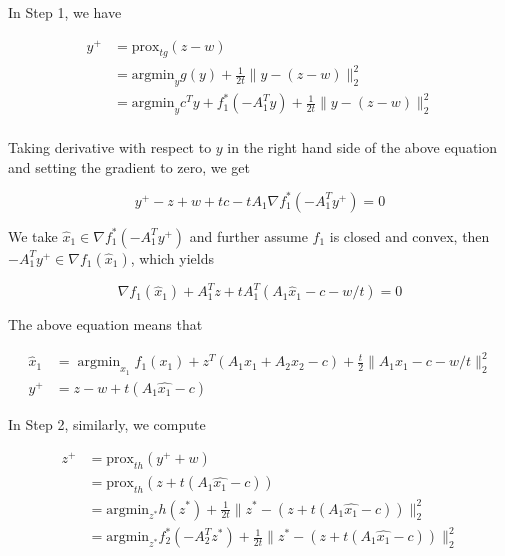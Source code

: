 \documentclass[a4paper]{article}
\begin{document}
In Step 1, we have

\begin{equation}
\begin{split}
y^+ & = \mathrm{prox}_{tg}(z-w)\\
	& = \textrm{argmin}_y g(y) + \frac{1}{2t}\lVert y-(z-w) \rVert_2^2\\ 
    & =  \textrm{argmin}_y c^Ty + f_1^*(-A_1^Ty) + \frac{1}{2t}\lVert y-(z-w) \rVert_2^2\\
\end{split}
\end{equation}

Taking derivative with respect to $y$ in the right hand side of the above equation and setting the gradient to zero, we get

\begin{equation}
y^+ - z + w + tc - tA_1\nabla f_1^*(-A_1^Ty^+) = 0
\end{equation}

We take $ \hat{x}_1 \in \nabla f_1^*(-A_1^Ty^+)$ and further assume $f_1$ is closed and convex, then $-A_1^Ty^+ \in \nabla f_1(\hat{x}_1)$, which yields

\begin{equation}
\nabla f_1(\hat{x}_1) + A_1^Tz + tA_1^T(A_1\hat{x}_1-c-w/t) = 0
\end{equation} 

The above equation means that 

\begin{equation}
\begin{split}
\hat{x}_1 & = \mathop{\arg\min}_{x_1}f_1(x_1)+z^T(A_1x_1+A_2x_2-c)+
\frac{t}{2}\lVert A_1x_1-c-w/t\rVert_2^2\\
y^+ & = z-w+t(A_1\hat{x_1}-c)
\end{split}
\end{equation}

In Step 2, similarly, we compute 

\begin{equation}
\begin{split}
z^+& =\mathrm{prox}_{th}(y^+ + w)\\
   & = \mathrm{prox}_{th}(z + t(A_1\hat{x_1}-c))\\
   & = \textrm{argmin}_{z^*} h(z^*) + \frac{1}{2t}\lVert z^*-(z + t(A_1\hat{x_1}-c)) \rVert_2^2\\ 
   & = \textrm{argmin}_{z^*} f_2^*(-A_2^Tz^*) + \frac{1}{2t}\lVert z^*-(z + t(A_1\hat{x_1}-c)) \rVert_2^2\\
\end{split}
\end{equation}
\end{document}
